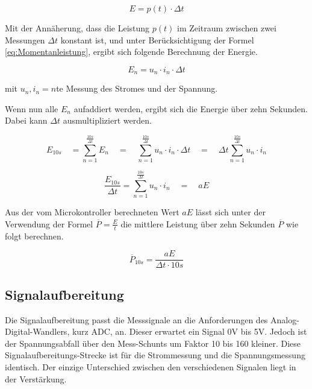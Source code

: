 \begin{equation}
	E = p(t) \cdot \Delta t
\end{equation}
\label{eq:energie1}

Mit der Annäherung, dass die Leistung $p(t)$ im Zeitraum zwischen zwei Messungen $\Delta t$ konstant ist, und unter Berücksichtigung der Formel \ref{eq:Momentanleistung}, ergibt sich folgende Berechnung der Energie.

\begin{equation}
	E_n = u_n \cdot i_n \cdot \Delta t
\end{equation}
\label{eq:energie2}

mit	$u_n, i_n = n $te Messung des Stromes und der Spannung.

Wenn nun alle $E_n$ aufaddiert werden, ergibt sich die Energie über zehn Sekunden. Dabei kann $\Delta t$ ausmultipliziert werden.

\begin{equation}
	E_{10s}\quad = \sum_{n=1}^{ \frac{10s}{\Delta t} } E_n \quad = \quad \sum_{n=1}^{ \frac{10s}{\Delta t} } u_n \cdot i_n \cdot \Delta t \quad = \quad \Delta t \sum_{n=1}^{ \frac{10s}{\Delta t} } u_n \cdot i_n
\end{equation}
\label{eq:energie3}


\begin{equation*}
	\frac{E_{10s}}{\Delta t} = \sum_{n=1}^{ \frac{10s}{\Delta t} } u_n \cdot i_n \quad = \quad aE
\end{equation*}
	
Aus der vom Microkontroller berechneten Wert $aE$ lässt sich unter der Verwendung der Formel $ \overline{P} = \frac{E}{t} $ die mittlere Leistung über zehn Sekunden $\overline{P}$ wie folgt berechnen.

\begin{equation}
	\overline{P}_{10s} = \frac{aE}{\Delta t \cdot 10s}
\end{equation}
\label{eq:mittlere_Leistung}

\subsection{Signalaufbereitung}\label{subsec:Signalaufbereitung}%
Die Signalaufbereitung passt die Messsignale an die Anforderungen des Analog-Digital-Wandlers, kurz ADC, an. Dieser erwartet ein Signal 0V bis 5V. Jedoch ist der Spannungsabfall über den Mess-Schunts um Faktor 10 bis 160 kleiner. Diese Signalaufbereitungs-Strecke ist für die Strommessung und die Spannungsmessung identisch. Der einzige Unterschied zwischen den verschiedenen Signalen liegt in der Verstärkung.

